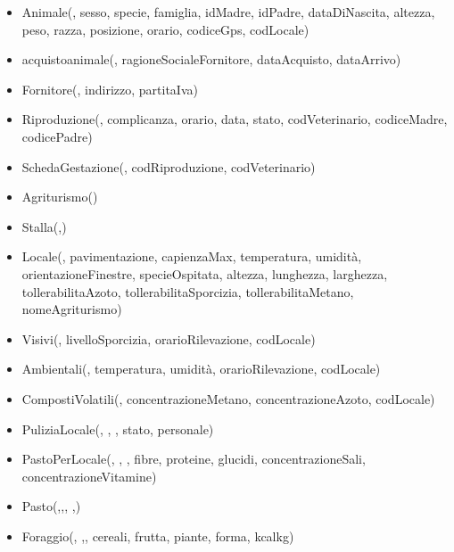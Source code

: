 \documentclass[12pt,a4paper]{article}
\begin{document}
\begin{itemize}

\item Animale(\underline{}, sesso, specie, famiglia, idMadre, idPadre, dataDiNascita, altezza, peso, razza, posizione, orario,  codiceGps,  codLocale)
\item acquistoanimale(\underline{}, ragioneSocialeFornitore,  dataAcquisto,  dataArrivo)
\item Fornitore(\underline{}, indirizzo, partitaIva)
\item Riproduzione(\underline{}, complicanza, orario, data, stato,  codVeterinario, codiceMadre, codicePadre)
\item SchedaGestazione(\underline{},  codRiproduzione,  codVeterinario)
\item Agriturismo(\underline{})
\item Stalla(\underline{},\underline{})
\item Locale(\underline{}, pavimentazione, capienzaMax, temperatura, umidità, orientazioneFinestre, specieOspitata, altezza, lunghezza, larghezza, tollerabilitaAzoto, tollerabilitaSporcizia, tollerabilitaMetano, nomeAgriturismo)
\item Visivi(\underline{}, livelloSporcizia,  orarioRilevazione,  codLocale)
\item Ambientali(\underline{}, temperatura, umidità,  orarioRilevazione,  codLocale)
\item CompostiVolatili(\underline{}, concentrazioneMetano, concentrazioneAzoto,  codLocale)
\item PuliziaLocale(\underline{}, \underline{}, \underline{}, stato, personale)
\item PastoPerLocale(\underline{}, \underline{},  \underline{},  fibre,  proteine,  glucidi,  concentrazioneSali,  concentrazioneVitamine)
\item Pasto(\underline{},\underline{},\underline{}, \underline{},\underline{})
\item Foraggio(\underline{}, \underline{},\underline{}, cereali, frutta, piante, forma, kcalkg)

\end{itemize}
\end{document}

